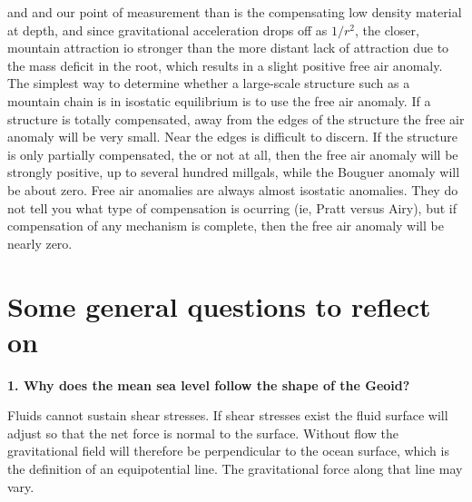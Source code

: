 \documentclass[a4paper,12pt]{article}
\newif\ifanswers
\begin{document}
\begin{tcolorbox}[enhanced jigsaw,breakable,pad at break*=1mm,
    colback=blue!5!white,colframe=babyblueeyes,title=Solutions]
    and and our point of measurement than is the compensating low density material at depth, and since gravitational acceleration drops off as $1/r^2$, the closer, mountain attraction io stronger than the more distant lack of attraction due to the mass deficit in the root, which results in a slight positive free air anomaly. The simplest way to determine whether a large-scale structure such as a mountain chain is in isostatic equilibrium is to use the free air anomaly. If a structure is totally compensated, away from the edges of the structure the free air anomaly will be very small. Near the edges is difficult to discern. If the structure is only partially compensated, the or not at all, then the free air anomaly will be strongly positive, up to several hundred millgals, while the Bouguer anomaly will be about zero. Free air anomalies are always almost isostatic anomalies. They do not tell you what type of compensation is ocurring (ie, Pratt versus Airy), but if compensation of any mechanism is complete, then the free air anomaly will be nearly zero.
  \end{tcolorbox}



\section{Some general questions to reflect on}

\textbf{1. Why does the mean sea level follow the shape of the Geoid?}
\ifanswers
  \begin{tcolorbox}[enhanced jigsaw,breakable,pad at break*=1mm,
    colback=blue!5!white,colframe=babyblueeyes,title=Solutions]
  Fluids cannot sustain shear stresses. If shear stresses exist the fluid surface will adjust so that the net force is normal to the surface. Without flow the gravitational field will therefore be perpendicular to the ocean surface, which is the definition of an equipotential line. The gravitational force along that line may vary.
  \end{tcolorbox}
\end{document}

